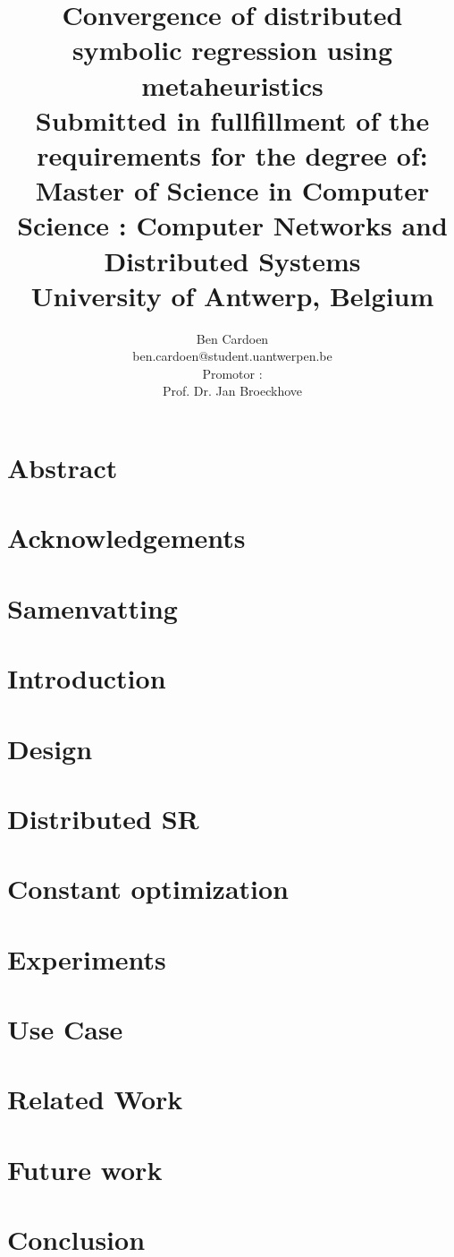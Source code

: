 \documentclass[titlepage]{article}
\title{Convergence of distributed symbolic regression using metaheuristics\\
\small Submitted in fullfillment of the requirements for the degree of:\\ Master of Science in Computer Science : Computer Networks and Distributed Systems\\
University of Antwerp, Belgium
    }
\author{
    Ben Cardoen  \\
    ben.cardoen@student.uantwerpen.be\\
    Promotor : \\
    Prof. Dr. Jan Broeckhove
}
\begin{document}
    
    \maketitle
    \section{Abstract}
    
    \newpage
    
    \section{Acknowledgements}
    
    \newpage
    \section{Samenvatting}
    
    \newpage
    
    \tableofcontents
    
    \newpage
    \section{Introduction}
    
    \newpage
    \section{Design}\label{secdesign}
    
    \newpage
    \section{Distributed SR}\label{secdistributed}
    
    \newpage
    \section{Constant optimization}\label{secconstopt}
    
    \newpage
    \section{Experiments}\label{secexperiments}
    
    \newpage
    \section{Use Case}\label{secusecase}
    
    \newpage
    \section{Related Work}
    
    \newpage
	\section{Future work}
    
    \newpage
    \section{Conclusion}
    
    \newpage
	\listoffigures
	\newpage
    \listoftables
    \newpage
    
    
    
\end{document}
